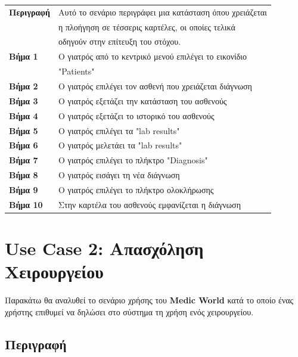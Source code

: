 \documentclass{article}
\newcommand\T{\rule{0pt}{2.6ex}}       %
\newcommand\B{\rule[-1.2ex]{0pt}{0pt}}
\begin{document}
 \begin{center}
     \begin{tabular}{|l|l|}
     \hline
      \textbf{Περιγραφή} & Αυτό το σενάριο περιγράφει μια κατάσταση όπου χρειάζεται \T \\& η πλοήγηση σε τέσσερις καρτέλες, οι οποίες τελικά\\& οδηγούν στην επίτευξη του στόχου. \B \\ 
      \hline
      \textbf{Βήμα 1} & Ο γιατρός από το κεντρικό μενού επιλέγει το εικονίδιο \T \\& "Patients" \B \\
      \hline
      \textbf{Βήμα 2} & Ο γιατρός επιλέγει τον ασθενή που χρειάζεται διάγνωση \T\B \\
      \hline
      \textbf{Βήμα 3} & Ο γιατρός εξετάζει την κατάσταση του ασθενούς \T\B \\
      \hline
      \textbf{Βήμα 4} & Ο γιατρός εξετάζει το ιστορικό του ασθενούς \T\B \\
      \hline
      \textbf{Βήμα 5} & Ο γιατρός επιλέγει τα "lab results" \T\B \\
      \hline
      \textbf{Βήμα 6} & Ο γιατρός μελετάει τα "lab results" \T\B \\
      \hline
      \textbf{Βήμα 7} & Ο γιατρός επιλέγει το πλήκτρο "Diagnosis" \T\B \\
      \hline
      \textbf{Βήμα 8} & Ο γιατρός εισάγει τη νέα διάγνωση \T\B \\
      \hline
      \textbf{Βήμα 9} & Ο γιατρός επιλέγει το πλήκτρο ολοκλήρωσης \T\B \\
      \hline
      \textbf{Βήμα 10} & Στην καρτέλα του ασθενούς εμφανίζεται η διάγνωση \T\B \\
      \hline
     \end{tabular}
 \end{center}
 

 
 \section{Use Case 2: Απασχόληση Χειρουργείου}
 
 Παρακάτω θα αναλυθεί το σενάριο χρήσης του \textbf{Medic World} κατά το οποίο ένας χρήστης επιθυμεί να δηλώσει στο σύστημα τη χρήση ενός χειρουργείου.

\subsection{Περιγραφή}
\end{document}

